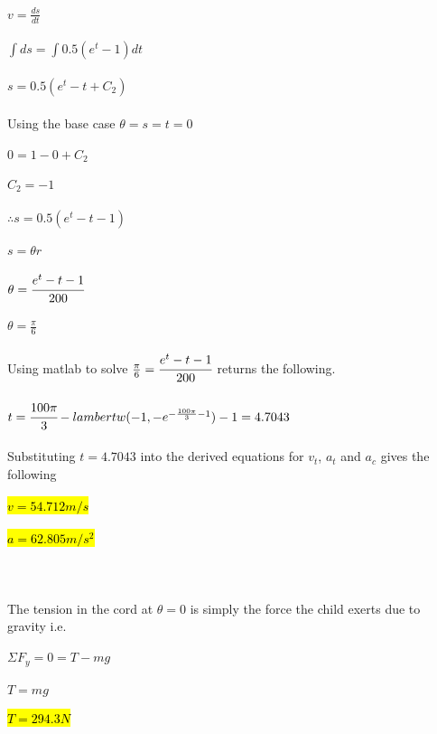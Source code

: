 \documentclass{article}
\begin{document}
\subsection{}
$v = \frac{ds}{dt}$\\ \\
$\int ds = \int 0.5(e^t - 1)dt$\\ \\
$s = 0.5(e^t - t + C_2)$\\ \\
Using the base case $\theta = s = t = 0$\\ \\
$0 = 1 - 0 + C_2$\\ \\
$C_2 = -1$\\ \\
$\therefore s = 0.5(e^t - t-1)$\\ \\
$s = \theta r$\\ \\
$\theta = \cfrac{e^t - t - 1}{200}$\\ \\
$\theta = \frac{\pi}{6}$\\ \\
Using matlab to solve $\frac{\pi}{6} = \cfrac{e^t - t - 1}{200}$ returns the following. \\ \\
$ t = \cfrac{100\pi}{3} - lambertw(-1, -e^{- \frac{100\pi}{3} - 1}) - 1 = 4.7043$ \\ \\

Substituting $t = 4.7043$ into the derived equations for $v_t$, $a_t$ and $a_c$ gives the following\\ \\
\hl{$v = 54.712 m/s$} \\ \\
\hl{$a = 62.805 m/s^2$} \\ \\
\section{}
\subsection{}
The tension in the cord at $\theta = 0$ is simply the force the child exerts due to gravity i.e.\\ \\
$\Sigma F_y = 0 = T - mg$\\ \\
$T = mg$ \\ \\
\hl{$T = 294.3N$}
\end{document}
